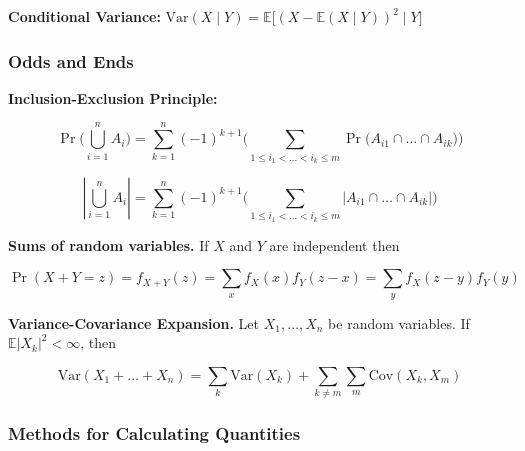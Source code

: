 \documentclass{article}
\newcommand{\E}{\mathbb{E}}
\newcommand{\Var}{\mathrm{Var}}
\newcommand{\Cov}{\mathrm{Cov}}
\begin{document}
\textbf{Conditional Variance:} \(\Var(X \mid Y) = \E\big[ (X - \E(X \mid Y))^2   \mid Y\big]\)

\subsubsection{Odds and Ends}

\textbf{Inclusion-Exclusion Principle:}

\[
\Pr \bigg( \bigcup_{i=1}^n A_i \bigg) = \sum_{k=1}^n (-1)^{k+1} \bigg( \sum_{1 \leq i_1 < \ldots < i_k \leq m} \Pr \big(A_{i1} \cap \ldots \cap A_{ik} \big) \bigg)
\]

\[
\left| \bigcup_{i=1}^n A_i \right| = \sum_{k=1}^n (-1)^{k+1} \bigg( \sum_{1 \leq i_1 < \ldots < i_k \leq m} \left| A_{i1} \cap \ldots \cap A_{ik} \right| \bigg)
\]

\textbf{Sums of random variables.} If \(X\) and \(Y\) are independent then

\[
\Pr(X + Y = z) = f_{X +Y}(z) = \sum_x f_X(x) f_Y(z-x) = \sum_y f_X(z - y) f_Y(y)
\]

\textbf{Variance-Covariance Expansion.} Let \(X_1, \ldots, X_n\) be random variables. If \(\E \left|X_k \right|^2 < \infty\), then 

\[
\Var(X_1 + \ldots + X_n) = \sum_k \Var(X_k) + \sum_{k \neq m} \sum_m \Cov(X_k, X_m)
\]

\subsubsection{Methods for Calculating Quantities}
\end{document}
